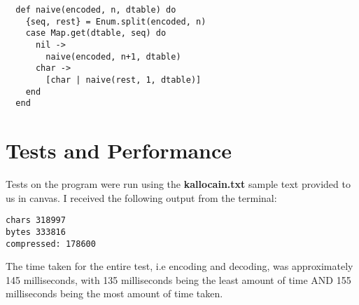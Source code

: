 \documentclass[a4paper,11pt]{article}
\begin{document}
\begin{verbatim}
  def naive(encoded, n, dtable) do
    {seq, rest} = Enum.split(encoded, n)
    case Map.get(dtable, seq) do
      nil ->
        naive(encoded, n+1, dtable)
      char ->
        [char | naive(rest, 1, dtable)]
    end
  end
\end{verbatim}

\section*{Tests and Performance}
Tests on the program were run using the \textbf{kallocain.txt} sample text provided to us in canvas. I received the following output from the terminal:
\begin{verbatim}
chars 318997 
bytes 333816
compressed: 178600
\end{verbatim}
The time taken for the entire test, i.e encoding and decoding, was approximately 145 milliseconds, with 135 milliseconds being the least amount of time AND 155 milliseconds being the most amount of time taken.
\end{document}
